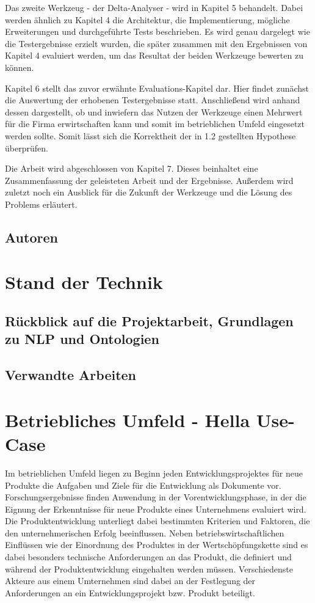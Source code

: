 \documentclass[12pt]{report}
\begin{document}
Das zweite Werkzeug - der Delta-Analyser - wird in Kapitel 5 behandelt. Dabei werden ähnlich zu Kapitel 4 die Architektur, die Implementierung, mögliche Erweiterungen und durchgeführte Tests beschrieben. Es wird genau dargelegt wie die Testergebnisse erzielt wurden, die später zusammen mit den Ergebnissen von Kapitel 4 evaluiert werden, um das Resultat der beiden Werkzeuge bewerten zu können. 

Kapitel 6 stellt das zuvor erwähnte Evaluations-Kapitel dar. Hier findet zunächst die Auswertung der erhobenen Testergebnisse statt.
Anschließend wird anhand dessen dargestellt, ob und inwiefern das Nutzen der Werkzeuge einen Mehrwert für die Firma erwirtschaften kann und somit im betrieblichen Umfeld eingesetzt werden sollte.  
Somit lässt sich die Korrektheit der in 1.2 gestellten Hypothese überprüfen.

Die Arbeit wird abgeschlossen von Kapitel 7. Dieses beinhaltet eine Zusammenfassung der geleisteten Arbeit und der Ergebnisse. Außerdem wird zuletzt noch ein Ausblick für die Zukunft der Werkzeuge und die Lösung des Problems erläutert. 

\section{Autoren}
\chapter{Stand der Technik}
\section{Rückblick auf die Projektarbeit, Grundlagen zu NLP und Ontologien}
\section{Verwandte Arbeiten}
\chapter{Betriebliches Umfeld - Hella Use-Case}
Im betrieblichen Umfeld liegen zu Beginn jeden Entwicklungsprojektes für neue Produkte die Aufgaben und Ziele für die Entwicklung als Dokumente vor. Forschungsergebnisse finden Anwendung in der Vorentwicklungsphase, in der die Eignung der Erkenntnisse für neue Produkte eines Unternehmens evaluiert wird. Die Produktentwicklung unterliegt dabei bestimmten Kriterien und Faktoren, die den unternehmerischen Erfolg beeinflussen. Neben betriebswirtschaftlichen Einflüssen wie der Einordnung des Produktes in der Wertschöpfungskette sind es dabei besonders technische Anforderungen an das Produkt, die definiert und während der Produktentwicklung eingehalten werden müssen. Verschiedenste Akteure aus einem Umternehmen sind dabei an der Festlegung der Anforderungen an ein Entwicklungsprojekt bzw. Produkt beteiligt. 
\end{document}
